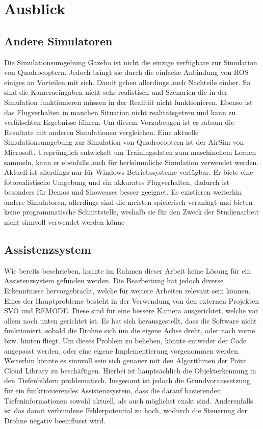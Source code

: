 \section{Ausblick}
\subsection{Andere Simulatoren}
Die Simulationsumgebung Gazebo ist nicht die einzige verfügbare zur Simulation von Quadrocoptern. Jedoch bringt sie durch die einfache Anbindung von ROS einiges an Vorteilen mit sich. Damit gehen allerdings auch Nachteile einher. So sind die Kameraeingaben nicht sehr realistisch und Szenarien die in der Simulation funktionieren müssen in der Realität nicht funktionieren. Ebenso ist das Flugverhalten in manchen Situation nicht realitätsgetreu und kann zu verfälschten Ergebnisse führen. Um diesem Vorzubeugen ist es ratsam die Resultate mit anderen Simulationen vergleichen. Eine aktuelle Simulationsumgebung zur Simulation von Quadrocoptern ist der AirSim von Microsoft.\cite{airsim} Ursprünglich entwickelt um Trainingsdaten zum maschinellem Lernen sammeln, kann er ebenfalls auch für herkömmliche Simulation verwendet werden. Aktuell ist allerdings nur für Windows Betriebssysteme verfügbar. \cite{airsimpaper} Er biete eine fotorealistische Umgebung und ein akkurates Flugverhalten, dadurch ist besonders für Demos und Showcases besser geeignet. \newline
Es existieren weiterhin andere Simulatoren, allerdings sind die meisten spielerisch veranlagt und bieten keine programmatische Schnittstelle, weshalb sie für den Zweck der Studienarbeit nicht sinnvoll verwendet werden könne



\subsection{Assistenzsystem}
Wie bereits beschrieben, konnte im Rahmen dieser Arbeit keine Lösung für ein Assistenzsystem gefunden werden. Die Bearbeitung hat jedoch diverse Erkenntnisse hervorgebracht, welche für weitere Arbeiten relevant sein können. \newline
Eines der Hauptprobleme besteht in der Verwendung von den externen Projekten SVO und REMODE. Diese sind für eine bessere Kamera ausgerichtet, welche vor allem nach unten gerichtet ist. Es hat sich herausgestellt, dass die Software nicht funktioniert, sobald die Drohne sich um die eigene Achse dreht, oder nach vorne bzw. hinten fliegt. Um dieses Problem zu beheben, könnte entweder der Code angepasst werden, oder eine eigene Implementierung vorgenommen werden. \newline
Weiterhin könnte es sinnvoll sein sich genauer mit den Algorithmen der Point Cloud Library zu beschäftigen. Hierbei ist hauptsächlich die Objekterkennung in den Tiefenbildern problematisch. \newline
Insgesamt ist jedoch die Grundvoraussetzung für ein funktionierendes Assistenzsystem, dass die darauf basierenden Tiefeninformationen sowohl aktuell, als auch möglichst exakt sind. Anderenfalls ist das damit verbundene Fehlerpotential zu hoch, wodurch die Steuerung der Drohne negativ beeinflusst wird.